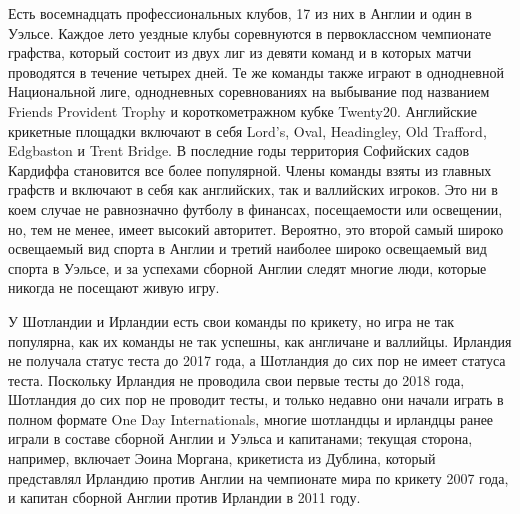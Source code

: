 Есть восемнадцать профессиональных клубов, 17 из них в Англии и один в Уэльсе. Каждое лето уездные клубы соревнуются в первоклассном чемпионате графства, который состоит из двух лиг из девяти команд и в которых матчи проводятся в течение четырех дней. Те же команды также играют в однодневной Национальной лиге, однодневных соревнованиях на выбывание под названием Friends Provident Trophy и короткометражном кубке Twenty20. Английские крикетные площадки включают в себя Lord's, Oval, Headingley, Old Trafford, Edgbaston и Trent Bridge. В последние годы территория Софийских садов Кардиффа становится все более популярной. Члены команды взяты из главных графств и включают в себя как английских, так и валлийских игроков. Это ни в коем случае не равнозначно футболу в финансах, посещаемости или освещении, но, тем не менее, имеет высокий авторитет. Вероятно, это второй самый широко освещаемый вид спорта в Англии и третий наиболее широко освещаемый вид спорта в Уэльсе, и за успехами сборной Англии следят многие люди, которые никогда не посещают живую игру.

У Шотландии и Ирландии есть свои команды по крикету, но игра не так популярна, как их команды не так успешны, как англичане и валлийцы. Ирландия не получала статус теста до 2017 года, а Шотландия до сих пор не имеет статуса теста. Поскольку Ирландия не проводила свои первые тесты до 2018 года, Шотландия до сих пор не проводит тесты, и только недавно они начали играть в полном формате One Day Internationals, многие шотландцы и ирландцы ранее играли в составе сборной Англии и Уэльса и капитанами; текущая сторона, например, включает Эоина Моргана, крикетиста из Дублина, который представлял Ирландию против Англии на чемпионате мира по крикету 2007 года, и капитан сборной Англии против Ирландии в 2011 году.

